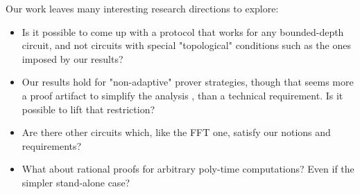 Our work leaves many interesting research directions to explore: 
\begin{itemize}
\item Is it possible to come up with a protocol that works for any bounded-depth circuit, and not circuits with special "topological" conditions such as the ones 
imposed by our results?
\item Our results hold for "non-adaptive" prover strategies, though that seems more a proof artifact to simplify the analysis , than a technical requirement. 
Is it possible to lift that restriction? 
\item Are there other circuits which, like the FFT one, satisfy our notions and requirements?
\item What about rational proofs for arbitrary poly-time computations? Even if the simpler stand-alone case?
\end{itemize}

%
%
%
%
%
%
%
%



